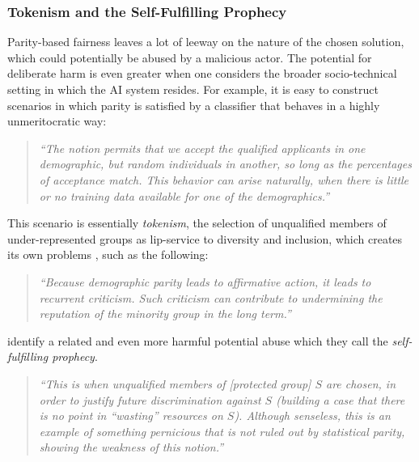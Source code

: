 \documentclass[11pt,dvipdfm]{article}
\begin{document}
\subsubsection{Tokenism and the Self-Fulfilling Prophecy}

Parity-based fairness leaves a lot of leeway on the nature of the chosen solution, which could potentially be abused by a malicious actor.  The potential for deliberate harm is even greater when one considers the broader socio-technical setting in which the AI system resides.  For example, it is easy to construct scenarios in which parity is satisfied by a classifier that behaves in a highly unmeritocratic way: 
\begin{quote}
\emph{``The notion permits that we accept the qualified applicants in one demographic, but random individuals in another, so long as the percentages of acceptance match. This behavior can arise naturally, when there is little or no training data available for one of the demographics.''} \cite{hardt2016equality}
\end{quote}
This scenario is essentially \emph{tokenism}, the selection of unqualified members of under-represented groups as lip-service to diversity and inclusion, which creates its own problems \cite{weisskopf2004affirmative}, such as the following:
\begin{quote}
    \emph{``Because demographic parity leads to affirmative action, it leads to recurrent criticism. Such criticism can contribute to undermining the reputation of the minority group in the long term.''} \cite{Landeau2020}
\end{quote}

\cite{dwork2012fairness} identify a related and even more harmful potential abuse which they call the \emph{self-fulfilling prophecy}. 
\begin{quote}
\emph{``This is when unqualified members of [protected group] $S$ are chosen, in order to justify future discrimination against $S$ (building a case that there is no point in ``wasting'' resources on $S$). Although senseless, this is an example of something pernicious that is not ruled out by statistical parity, showing the weakness of this notion.''} \cite{dwork2012fairness}
\end{quote}
\end{document}

